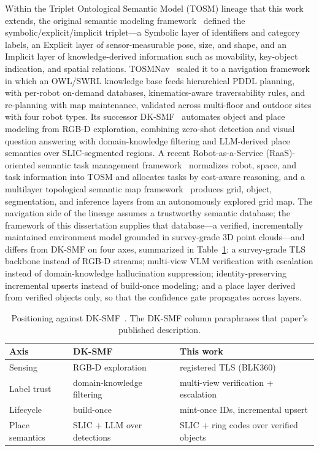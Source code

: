 Within the Triplet Ontological Semantic Model (TOSM) lineage that this work
extends, the original semantic modeling framework~\cite{joo2020tosm} defined
the symbolic/explicit/implicit triplet---a Symbolic layer of identifiers and
category labels, an Explicit layer of sensor-measurable pose, size, and shape,
and an Implicit layer of knowledge-derived information such as movability,
key-object indication, and spatial relations. TOSMNav~\cite{joo2022fsom}
scaled it to a navigation framework in which an OWL/SWRL knowledge base feeds
hierarchical PDDL planning, with per-robot on-demand databases,
kinematics-aware traversability rules, and re-planning with map maintenance,
validated across multi-floor and outdoor sites with four robot types. Its
successor DK-SMF~\cite{joo2025dksmf,joo2025phd} automates object and place
modeling from RGB-D exploration, combining zero-shot detection and visual
question answering with domain-knowledge filtering and LLM-derived place
semantics over SLIC-segmented regions. A recent Robot-as-a-Service
(RaaS)-oriented semantic task management framework~\cite{kwon2025}
normalizes robot, space, and task
information into TOSM and allocates tasks by cost-aware reasoning, and a
multilayer topological semantic map framework~\cite{kwon2024} produces grid,
object, segmentation, and inference layers from an autonomously explored grid
map. The navigation side of the lineage assumes a trustworthy semantic
database; the framework of this dissertation supplies that database---a
verified, incrementally maintained environment model grounded in survey-grade
3D point clouds---and differs from DK-SMF on four axes, summarized in
Table~\ref{tab:dksmf}: a survey-grade TLS backbone instead of RGB-D streams;
multi-view VLM verification with escalation instead of domain-knowledge
hallucination suppression; identity-preserving incremental upserts instead of
build-once modeling; and a place layer derived from verified objects only, so
that the confidence gate propagates across layers.

\begin{table}[htbp]
  \centering
  \caption{Positioning against DK-SMF~\cite{joo2025dksmf}. The DK-SMF column
  paraphrases that paper's published description.}
  \label{tab:dksmf}
  \begin{tabularx}{\textwidth}{l X X}
    \toprule
    \textbf{Axis} & \textbf{DK-SMF} & \textbf{This work} \\
    \midrule
    Sensing & RGB-D exploration & registered TLS (BLK360) \\
    Label trust & domain-knowledge filtering & multi-view verification + escalation \\
    Lifecycle & build-once & mint-once IDs, incremental upsert \\
    Place semantics & SLIC + LLM over detections & SLIC + ring codes over verified objects \\
    \bottomrule
  \end{tabularx}
\end{table}

